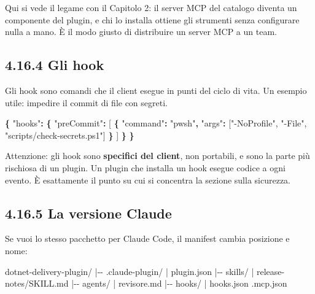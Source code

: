 \documentclass[
  italian,
  10pt,
]{book}
\newenvironment{Shaded}{\begin{snugshade}}{\end{snugshade}}
\newcommand{\DataTypeTok}[1]{\textcolor[rgb]{0.13,0.29,0.53}{#1}}
\newcommand{\FunctionTok}[1]{\textcolor[rgb]{0.13,0.29,0.53}{\textbf{#1}}}
\newcommand{\NormalTok}[1]{#1}
\newcommand{\OtherTok}[1]{\textcolor[rgb]{0.56,0.35,0.01}{#1}}
\newcommand{\StringTok}[1]{\textcolor[rgb]{0.31,0.60,0.02}{#1}}
\begin{document}
Qui si vede il legame con il Capitolo 2: il server MCP del catalogo
diventa un componente del plugin, e chi lo installa ottiene gli
strumenti senza configurare nulla a mano. È il modo giusto di
distribuire un server MCP a un team.

\subsection{4.16.4 Gli hook}\label{gli-hook}

Gli hook sono comandi che il client esegue in punti del ciclo di vita.
Un esempio utile: impedire il commit di file con segreti.

\begin{Shaded}
\begin{Highlighting}[]
\FunctionTok{\{}
  \DataTypeTok{"hooks"}\FunctionTok{:} \FunctionTok{\{}
    \DataTypeTok{"preCommit"}\FunctionTok{:} \OtherTok{[}
      \FunctionTok{\{}
        \DataTypeTok{"command"}\FunctionTok{:} \StringTok{"pwsh"}\FunctionTok{,}
        \DataTypeTok{"args"}\FunctionTok{:} \OtherTok{[}\StringTok{"{-}NoProfile"}\OtherTok{,} \StringTok{"{-}File"}\OtherTok{,} \StringTok{"scripts/check{-}secrets.ps1"}\OtherTok{]}
      \FunctionTok{\}}
    \OtherTok{]}
  \FunctionTok{\}}
\FunctionTok{\}}
\end{Highlighting}
\end{Shaded}

Attenzione: gli hook sono \textbf{specifici del client}, non portabili,
e sono la parte più rischiosa di un plugin. Un plugin che installa un
hook esegue codice a ogni evento. È esattamente il punto su cui si
concentra la sezione sulla sicurezza.

\subsection{4.16.5 La versione Claude}\label{la-versione-claude}

Se vuoi lo stesso pacchetto per Claude Code, il manifest cambia
posizione e nome:

\begin{Shaded}
\begin{Highlighting}[]
\NormalTok{dotnet{-}delivery{-}plugin/}
\NormalTok{|{-}{-} .claude{-}plugin/}
\NormalTok{|   \textasciigrave{}{-}{-} plugin.json}
\NormalTok{|{-}{-} skills/}
\NormalTok{|   \textasciigrave{}{-}{-} release{-}notes/SKILL.md}
\NormalTok{|{-}{-} agents/}
\NormalTok{|   \textasciigrave{}{-}{-} revisore.md}
\NormalTok{|{-}{-} hooks/}
\NormalTok{|   \textasciigrave{}{-}{-} hooks.json}
\NormalTok{\textasciigrave{}{-}{-} .mcp.json}
\end{Highlighting}
\end{Shaded}
\end{document}
